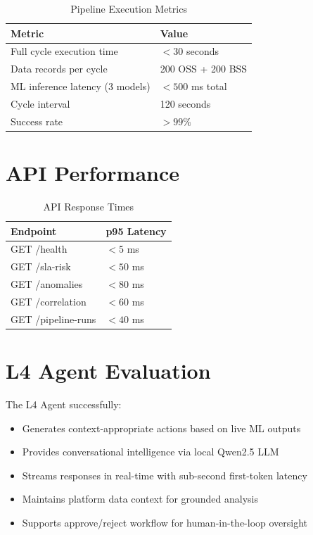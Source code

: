 \begin{table}[H]
\centering
\caption{Pipeline Execution Metrics}
\label{tab:pipeline-metrics}
\begin{tabular}{@{}ll@{}}
\toprule
\textbf{Metric} & \textbf{Value} \\
\midrule
Full cycle execution time & $< 30$ seconds \\
Data records per cycle & 200 OSS + 200 BSS \\
ML inference latency (3 models) & $< 500$ ms total \\
Cycle interval & 120 seconds \\
Success rate & $> 99\%$ \\
\bottomrule
\end{tabular}
\end{table}

\section{API Performance}

\begin{table}[H]
\centering
\caption{API Response Times}
\label{tab:api-perf}
\begin{tabular}{@{}ll@{}}
\toprule
\textbf{Endpoint} & \textbf{p95 Latency} \\
\midrule
GET /health & $< 5$ ms \\
GET /sla-risk & $< 50$ ms \\
GET /anomalies & $< 80$ ms \\
GET /correlation & $< 60$ ms \\
GET /pipeline-runs & $< 40$ ms \\
\bottomrule
\end{tabular}
\end{table}

\section{L4 Agent Evaluation}

The L4 Agent successfully:
\begin{itemize}
    \item Generates context-appropriate actions based on live ML outputs
    \item Provides conversational intelligence via local Qwen2.5 LLM
    \item Streams responses in real-time with sub-second first-token latency
    \item Maintains platform data context for grounded analysis
    \item Supports approve/reject workflow for human-in-the-loop oversight
\end{itemize}

